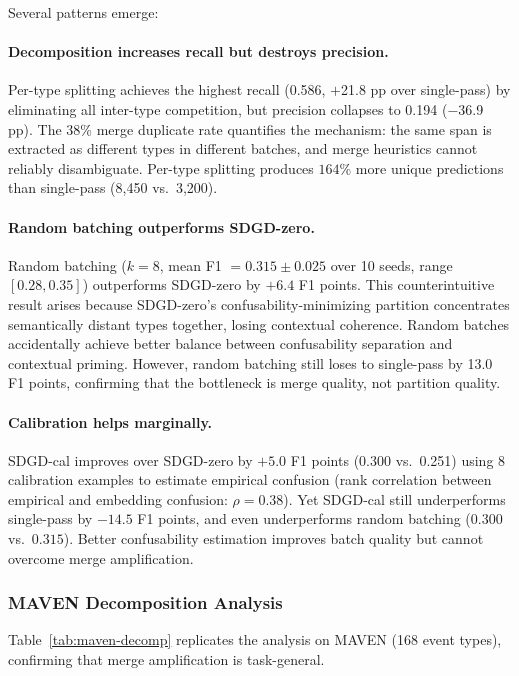 \documentclass[11pt,a4paper]{article}
\begin{document}
Several patterns emerge:

\paragraph{Decomposition increases recall but destroys precision.}
Per-type splitting achieves the highest recall (0.586, $+$21.8 pp over single-pass) by eliminating all inter-type competition, but precision collapses to 0.194 ($-$36.9 pp). The 38\% merge duplicate rate quantifies the mechanism: the same span is extracted as different types in different batches, and merge heuristics cannot reliably disambiguate. Per-type splitting produces $164\%$ more unique predictions than single-pass (8{,}450 vs.\ 3{,}200).

\paragraph{Random batching outperforms SDGD-zero.}
Random batching ($k\!=\!8$, mean F1 $= 0.315 \pm 0.025$ over 10 seeds, range $[0.28, 0.35]$) outperforms SDGD-zero by $+6.4$ F1 points. This counterintuitive result arises because SDGD-zero's confusability-minimizing partition concentrates semantically distant types together, losing contextual coherence. Random batches accidentally achieve better balance between confusability separation and contextual priming. However, random batching still loses to single-pass by 13.0 F1 points, confirming that the bottleneck is merge quality, not partition quality.

\paragraph{Calibration helps marginally.}
SDGD-cal improves over SDGD-zero by $+5.0$ F1 points (0.300 vs.\ 0.251) using 8 calibration examples to estimate empirical confusion (rank correlation between empirical and embedding confusion: $\rho = 0.38$). Yet SDGD-cal still underperforms single-pass by $-14.5$ F1 points, and even underperforms random batching ($0.300$ vs.\ $0.315$). Better confusability estimation improves batch quality but cannot overcome merge amplification.

\subsubsection{MAVEN Decomposition Analysis}

Table~\ref{tab:maven-decomp} replicates the analysis on MAVEN (168 event types), confirming that merge amplification is task-general.
\end{document}

